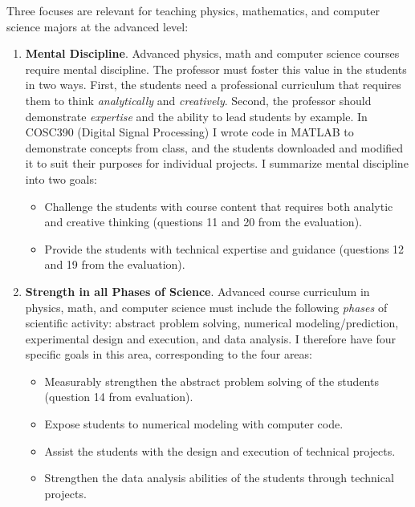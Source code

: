 \documentclass[../../main.tex]{subfiles}
\begin{document}
Three focuses are relevant for teaching physics, mathematics, and computer science majors at the advanced level:
\begin{enumerate}
\item \textbf{Mental Discipline}.  Advanced physics, math and computer science courses require mental discipline.  The professor must foster this value in the students in two ways.  First, the students need a professional curriculum that requires them to think \textit{analytically} and \textit{creatively}.  Second, the professor should demonstrate \textit{expertise} and the ability to lead students by example.  In COSC390 (Digital Signal Processing) I wrote code in MATLAB to demonstrate concepts from class, and the students downloaded and modified it to suit their purposes for individual projects.  I summarize mental discipline into two goals:

\begin{itemize}
\item Challenge the students with course content that requires both analytic and creative thinking (questions 11 and 20 from the evaluation).
\item Provide the students with technical expertise and guidance (questions 12 and 19 from the evaluation).
\end{itemize}

\item \textbf{Strength in all Phases of Science}. Advanced course curriculum in physics, math, and computer science must include the following \textit{phases} of scientific activity: abstract problem solving, numerical modeling/prediction, experimental design and execution, and data analysis. I therefore have four specific goals in this area, corresponding to the four areas:

\begin{itemize}
\item Measurably strengthen the abstract problem solving of the students (question 14 from evaluation).
\item Expose students to numerical modeling with computer code.  %
\item Assist the students with the design and execution of technical projects. %
\item Strengthen the data analysis abilities of the students through technical projects. %
\end{itemize}


\end{enumerate}
\end{document}
